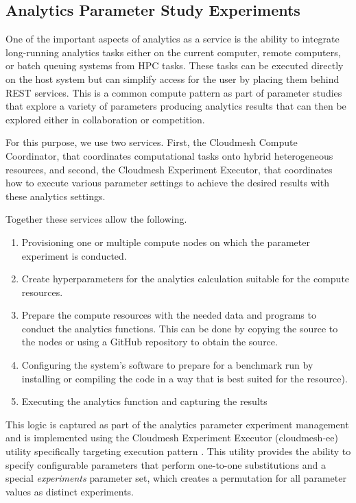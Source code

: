 \subsection{Analytics Parameter Study Experiments}

One of the important aspects of analytics as a service is the ability to integrate long-running analytics tasks either 
on the current computer, remote computers, or batch queuing systems from HPC tasks. These tasks can be 
executed directly on the host system but can simplify access for the user by placing them behind REST 
services. This is a common compute pattern as part of parameter studies that explore a variety of 
parameters producing analytics results that can then be explored either in collaboration or competition. 

For this purpose, we use two services. First, the Cloudmesh Compute Coordinator, that coordinates computational tasks onto hybrid heterogeneous resources, and second, the Cloudmesh Experiment Executor, that coordinates how to execute various parameter settings to achieve the desired results with these analytics settings.

Together these services allow the following.

\begin{enumerate}
    \item Provisioning one or multiple compute nodes on which the parameter experiment is conducted.
    \item Create hyperparameters for the analytics calculation suitable for the compute resources.
    \item Prepare the compute resources with the needed data and programs to conduct the analytics 
          functions. This can be done by copying the source to the nodes or using a GitHub repository to 
          obtain the source.
    \item Configuring the system's software to prepare for a benchmark run by installing or compiling the code 
          in a way that is best suited for the resource).
    \item Executing the analytics function and capturing the results
\end{enumerate}

This logic is captured as part of the analytics parameter experiment management and is implemented using the Cloudmesh Experiment Executor (cloudmesh-ee) utility specifically targeting execution pattern \cite{cloudmesh-ee,las-2023-escience,las-2023-mlcommons-edu-eq}.
This utility provides the ability to specify configurable parameters that perform one-to-one substitutions and a special \textit{experiments} parameter set, which creates a permutation for all parameter values as distinct experiments.

